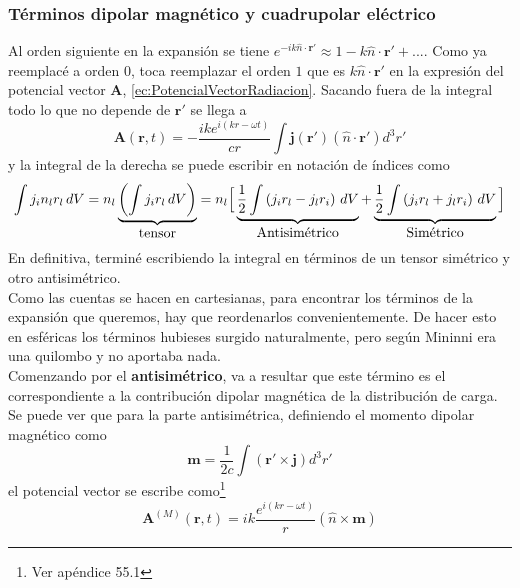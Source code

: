 \subsubsection{Términos dipolar magnético y cuadrupolar eléctrico}
Al orden siguiente en la expansión se tiene $e^{-ik\hat{n}\cdot \textbf{r}'} \approx 1 - k\hat{n}\cdot \textbf{r}' + ... $. Como ya reemplacé a orden $0$, toca reemplazar el orden $1$ que es $k\hat{n}\cdot \textbf{r}'$ en la expresión del potencial vector $\textbf{A}$, \eqref{ec:PotencialVectorRadiacion}. Sacando fuera de la integral todo lo que no depende de $\textbf{r}'$ se llega a
\begin{equation*}
    \textbf{A}(\textbf{r},t) 
    = -\frac{i k e^{i(kr - \omega t)}}{cr}
    \int \textbf{j}(\textbf{r}')(\hat{n}\cdot \textbf{r}')d^{3}r'
\end{equation*}
y la integral de la derecha se puede escribir en notación de índices como
\begin{equation*}
    \int j_{i}n_{l}r_{l}\,dV 
    = n_{l}
    \underbrace%
    {%
        \left(
            \int j_{i}r_{l}\,dV
        \right)
    }_{\mbox{tensor}}
    = n_{l}
    \Big[
        \underbrace%
        {%
            \frac{1}{2}
            \int
            \left(
                j_{i}r_{l} - j_{l}r_{i}
            \right)\,dV
        }_{\mbox{Antisimétrico}}
        +
        \underbrace%
        {%
            \frac{1}{2}
            \int
            \left(
                j_{i}r_{l} + j_{l}r_{i}
            \right)\,dV
        }_{\mbox{Simétrico}}
    \Big]
\end{equation*}
En definitiva, terminé escribiendo la integral en términos de un tensor simétrico y otro antisimétrico.\\
\indent Como las cuentas se hacen en cartesianas, para encontrar los términos de la expansión que queremos, hay que reordenarlos convenientemente. De hacer esto en esféricas los términos hubieses surgido naturalmente, pero según Mininni era una quilombo y no aportaba nada.\\
\indent Comenzando por el \textbf{antisimétrico}, va a resultar que este término es el correspondiente a la contribución dipolar magnética de la distribución de carga. Se puede ver que para la parte antisimétrica, definiendo el momento dipolar magnético como
\begin{equation*}
    \textbf{m} = \frac{1}{2c}
    \int (\textbf{r}'\times \textbf{j})d^{3}r'
\end{equation*}
el potencial vector se escribe como\footnote{Ver apéndice 55.1}
\begin{equation*}
    \textbf{A}^{(M)} (\textbf{r},t) 
    = ik\frac{e^{i(kr - \omega t)}}{r}
    \left( \hat{n} \times \textbf{m} \right)
\end{equation*}
